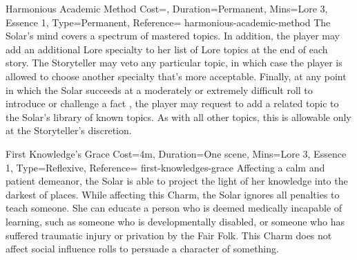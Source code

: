 \begin{Charm}{Harmonious Academic Method}{
    Cost=\NoCost,
    Duration=Permanent,
    Mins={Lore 3, Essence 1},
    Type=Permanent,
    Reference=\cite*[p.~330]{ex3}
}{harmonious-academic-method}
    The Solar’s mind covers a spectrum of mastered topics.  In addition, the player may add an
    additional Lore specialty to her list of Lore topics at the end of each
    story. The Storyteller may veto any particular topic, in which case the
    player is allowed to choose another specialty that’s more acceptable.
    Finally, at any point in which the Solar succeeds at a moderately or
    extremely difficult roll to introduce or challenge a fact
    \parencite*[p.~237]{ex3}, the player may request to add a related topic to
    the Solar’s library of known topics. As with all other topics, this is
    allowable only at the Storyteller’s discretion.
\end{Charm}

\begin{Charm}{First Knowledge's Grace}{
    Cost=4m,
    Duration=One scene,
    Mins={Lore 3, Essence 1},
    Type=Reflexive,
    Reference=\cite*[p.~330]{ex3}
}{first-knowledges-grace}
    Affecting a calm and patient demeanor, the Solar is able to project the
    light of her knowledge into the darkest of places. While affecting this
    Charm, the Solar ignores all penalties to teach someone. She can educate a
    person who is deemed medically incapable of learning, such as someone who
    is developmentally disabled, or someone who has suffered traumatic injury
    or privation by the Fair Folk. This Charm does not affect social influence
    rolls to persuade a character of something.
\end{Charm}

